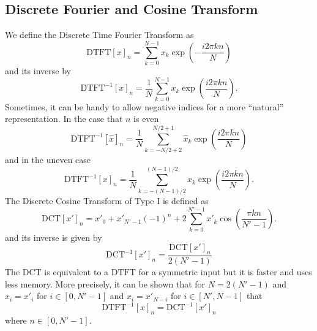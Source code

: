\documentclass[18pt,a4paper]{extarticle}
\begin{document}
\subsection{Discrete Fourier and Cosine Transform}
We define the Discrete Time Fourier Transform as
\begin{equation}
\mathrm{DTFT}[x]_n = \sum^{N-1}_{k=0} x_k \exp\left(-\frac{i2\pi kn}{N}\right)
\end{equation}
and its inverse by
\begin{equation}
\mathrm{DTFT}^{-1}[x]_n = \frac{1}{N}\sum^{N-1}_{k=0} x_k \exp\left(\frac{i2\pi kn}{N}\right).
\end{equation}
Sometimes, it can be handy to allow negative indices for a more ``natural'' representation.
In the case that $n$ is even
\begin{equation}
\mathrm{DTFT}^{-1}[\hat{x}]_n = \frac{1}{N}\sum^{N/2+1}_{k=-N/2+2} \hat{x}_k \exp\left(\frac{i2\pi kn}{N}\right)
\end{equation}
and in the uneven case
\begin{equation}
\mathrm{DTFT}^{-1}[x]_n = \frac{1}{N}\sum^{(N-1)/2}_{k=-(N-1)/2} x_k \exp\left(\frac{i2\pi kn}{N}\right).
\end{equation}
The Discrete Cosine Transform of Type I is defined as
\begin{equation}
\mathrm{DCT}[x']_n = x'_0 + x'_{N'-1}(-1)^n + 2\sum_{k=0}^{N'-1} x'_k \cos \left(\frac{\pi k n}{N'-1}  \right).
\end{equation}
and its inverse is given by
\begin{equation}
\mathrm{DCT}^{-1}[x']_n = \frac{\mathrm{DCT}[x']_n}{2(N'-1)}
\end{equation}
The $\mathrm{DCT}$ is equivalent to a $\mathrm{DTFT}$ for a symmetric input but it is faster and uses less memory.
More precisely, it can be shown that for $N=2(N'-1)$ and $x_i=x'_i$ for $i\in[0, N'-1]$ and $x_i=x'_{N-i}$ for $i\in[N', N-1]$ that
\begin{equation}
\mathrm{DTFT}^{-1}[x]_n = \mathrm{DCT}^{-1}[x']_n 
\end{equation}
where $n\in[0, N'-1]$.
\end{document}
